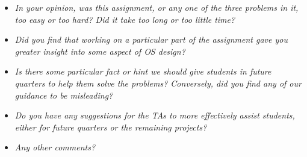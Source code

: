 \documentclass[journal]{IEEEtran}
\begin{document}
\begin{itemize}
\item \textit{In your opinion, was this assignment, or any one of the three problems in it, too easy or too hard?  Did it take too long or too little time?}

\item \textit{Did you find that working on a particular part of the assignment gave you greater insight into some aspect of OS design?}

\item \textit{Is there some particular fact or hint we should give students in future quarters to help them solve the problems?  Conversely, did you find any of our guidance to be misleading?}

\item \textit{Do you have any suggestions for the TAs to more effectively assist students, either for future quarters or the remaining projects?}

\item \textit{Any other comments?}
\end{itemize}
\end{document}
